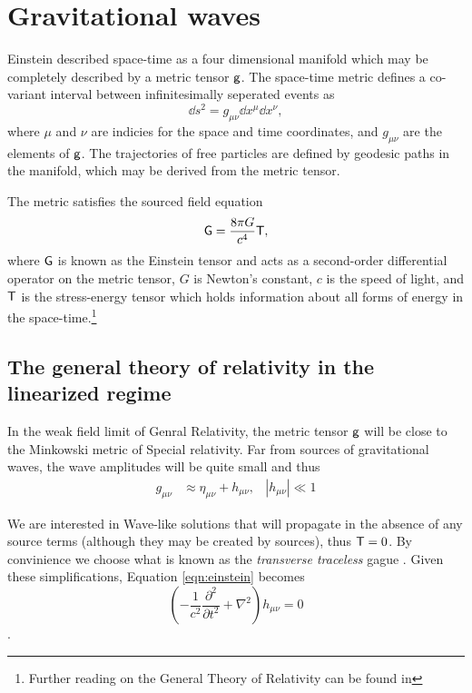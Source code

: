 \chapter{Gravitational waves}


Einstein described space-time as a four dimensional manifold which may be completely described by a metric tensor $\mathsf{g}$. %
The space-time metric defines a co-variant interval between infinitesimally seperated events as
\begin{equation}
\dd s^2 = g_{\mu \nu}\dd x^\mu \dd x^\nu,
\end{equation}
where $\mu$ and $\nu$ are indicies for the space and time coordinates, and $g_{\mu \nu}$ are the elements of $\mathsf{g}$. %
The trajectories of free particles are defined by geodesic paths in the manifold, which may be derived from the metric tensor.

The metric satisfies the sourced field equation
\begin{equation}
\label{eqn:einstein}
\mathsf{G}=\frac{8\pi G}{c^4}\mathsf{T},
\end{equation}
where $\mathsf{G}$ is known as the Einstein tensor and acts as a second-order differential operator on the metric tensor, $G$ is Newton's constant, $c$ is the speed of light, and $\mathsf{T}$ is the stress-energy tensor which holds information about all forms of energy in the space-time.\footnote{Further reading on the General Theory of Relativity can be found in }

\section{The general theory of relativity in the linearized regime}
In the weak field limit of Genral Relativity, the metric tensor $\mathsf{g}$ will be close to the Minkowski metric of Special relativity. %
Far from sources of gravitational waves, the wave amplitudes will be quite small and thus
\begin{align}
g_{\mu \nu}&\approx \eta_{\mu \nu}+h_{\mu \nu}, &|h_{\mu \nu}|\ll 1
\end{align}

We are interested in Wave-like solutions that will propagate in the absence of any source terms (although they may be created by sources), thus $\mathsf{T}=0$. %
By convinience we choose what is known as the \emph{transverse traceless} gague . %
Given these simplifications, Equation \ref{eqn:einstein} becomes
\begin{equation}
\left(-\frac{1}{c^2}\frac{\partial^2}{\partial t^2}+\nabla^2\right)h_{\mu \nu}=0
\end{equation}
.


